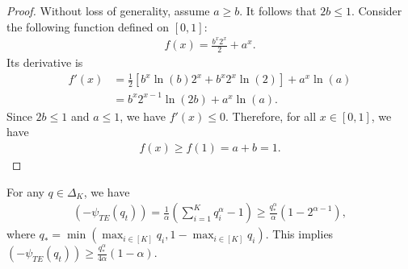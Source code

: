 \begin{proof}
    Without loss of generality, assume $a \geq b$. It follows that $2b \leq 1$.   Consider the following function defined on $[0, 1]$:
    \begin{align}
        f(x) = \frac{b^x 2^{x}}{2} + a^x.
    \end{align}
    Its derivative is
    \begin{align}
        f'(x) &= \frac{1}{2}\left[ b^x \ln(b) 2^x + b^x 2^x \ln(2) \right] + a^x\ln(a)  \\
        &= b^x 2^{x-1} \ln(2b) + a^x\ln(a).
    \end{align}
    Since $2b \leq 1$ and $a \leq 1$, we have $f'(x) \leq 0$. Therefore, for all $x \in [0,1]$, we  have 
    \begin{align}
        f(x) \geq f(1) = a + b = 1.
    \end{align}
\end{proof}
\begin{lemma}
    For any $q \in \Delta_K$, we have
    \begin{align}
        (-\psi_{TE}(q_t)) = \frac{1}{\alpha}\left(\sum_{i=1}^K q_i^\alpha  - 1 \right) \geq \frac{q_{*}^{\alpha}}{\alpha}(1-2^{\alpha-1}),
        \label{eq:lowerboundht}
    \end{align}
    where $q_* = \min(\max_{i \in [K]}q_i, 1 - \max_{i \in [K]}q_i)$. This implies $(-\psi_{TE}(q_t)) \geq \frac{q_{*}^{\alpha}}{4\alpha}(1-\alpha)$.
    \label{lemma:lowerboundht}
\end{lemma}
